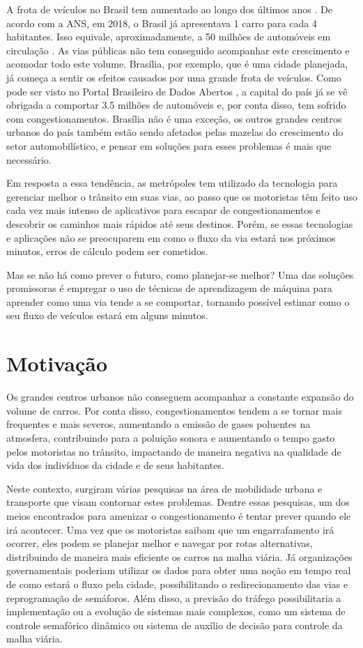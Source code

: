 A frota  de  veículos no Brasil tem aumentado ao longo  dos últimos anos \cite{mapa_moto2019v2}. De acordo com a \acrfull{ANS}, em 2018, o Brasil já apresentava 1 carro para cada 4 habitantes. Isso equivale, aproximadamente, a 50 milhões de automóveis em circulação \cite{G1}. As vias públicas não tem conseguido acompanhar este crescimento e acomodar todo este volume. Brasília, por exemplo, que é uma cidade planejada, já começa a sentir os efeitos causados por uma grande frota de veículos. Como pode ser visto no Portal Brasileiro de Dados Abertos \cite{detran_2018}, a capital do país já se vê obrigada a comportar 3.5 milhões de automóveis e, por conta disso, tem sofrido com congestionamentos. Brasília não é uma exceção, os outros grandes centros urbanos do país também estão sendo afetados pelas mazelas do crescimento do setor automobilístico, e pensar em soluções para esses problemas é mais que necessário.

Em resposta a essa tendência, as metrópoles tem utilizado da tecnologia para gerenciar melhor o trânsito em suas vias, ao passo que os motoristas têm feito uso cada vez mais intenso de aplicativos para escapar de congestionamentos e descobrir os caminhos mais rápidos até seus destinos. Porém, se essas tecnologias e aplicações não se preocuparem em como o fluxo da via estará nos próximos minutos, erros de cálculo podem ser cometidos.

Mas se não há como prever o futuro, como planejar-se melhor? Uma das soluções promissoras é empregar o uso de técnicas de aprendizagem de máquina para aprender como uma via tende a se comportar, tornando possível estimar como o seu fluxo de veículos estará em alguns minutos.

\section{Motivação}

Os grandes centros urbanos não conseguem acompanhar a constante expansão do volume de carros. Por conta disso, congestionamentos tendem a se tornar mais frequentes e mais severos, aumentando a emissão de gases poluentes na atmosfera, contribuindo para a poluição sonora e aumentando o tempo gasto pelos motoristas no trânsito, impactando de maneira negativa na qualidade de vida dos indivíduos da cidade e de seus habitantes.

Neste contexto, surgiram várias pesquisas na área de mobilidade urbana e transporte que visam contornar estes problemas. Dentre essas pesquisas, um dos meios encontrados para amenizar o congestionamento é tentar prever quando ele irá acontecer. Uma vez que os motoristas saibam que um engarrafamento irá ocorrer, eles podem se planejar melhor e navegar por rotas alternativas, distribuindo de maneira mais eficiente os carros na malha viária. Já organizações governamentais poderiam utilizar os dados para obter uma noção em tempo real de como estará o fluxo pela cidade, possibilitando o redirecionamento das vias e reprogramação de semáforos. Além disso, a previsão do tráfego possibilitaria a implementação ou a evolução de sistemas mais complexos, como um sistema de controle semafórico dinâmico ou sistema de auxílio de decisão para controle da malha viária.

